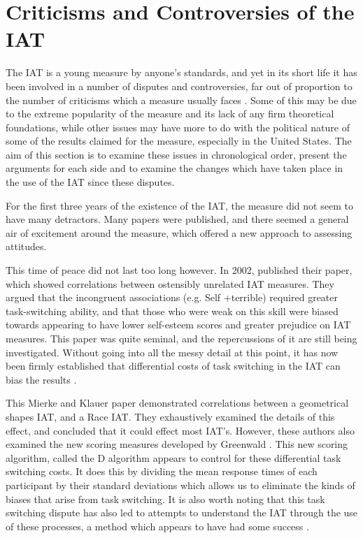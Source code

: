 \section{Criticisms and Controversies of the IAT}

The IAT is a young measure by anyone's standards, and yet in its short life it has been involved in a number of disputes and controversies, far out of proportion to the number of criticisms which a measure usually faces \cite{VonHippel2004}. Some of this may be due to the  extreme popularity of the measure and its lack of any firm theoretical foundations, while other issues may have more to do with the political nature of some of the results claimed for the measure, especially in the United States.  The aim of this section is to examine these issues in chronological order, present the arguments for each side and to examine the changes which have taken place in the use of the IAT since these disputes. 

For the first three years of the existence of the IAT, the measure did not seem to have many detractors. Many papers were published, and there seemed a general air of excitement around the measure, which offered a new approach to assessing attitudes. 

This time of peace did not last too long however. In 2002, \cite{McFarland2002} published their paper, which showed correlations between ostensibly unrelated IAT measures. They argued that the incongruent associations (e.g. Self +terrible) required greater task-switching ability, and that those who were weak on this skill were biased towards appearing to have lower self-esteem scores and greater prejudice on IAT measures. This paper was quite seminal, and the repercussions of it are still being investigated. Without going into all the messy detail at this point, it has now been firmly established that differential costs of task switching in the IAT can bias the results \cite{Mierke2001,Mierke2003}. 

This Mierke and Klauer paper demonstrated correlations between a geometrical shapes IAT, and a Race IAT. They exhaustively examined the details of this effect, and concluded that it could effect most IAT's. However, these authors also examined the new scoring measures developed by Greenwald \cite{Greenwald2003a}. This new scoring algorithm, called the D algorithm appears to control for these differential task switching costs. It does this by dividing the mean response times of each participant by their standard deviations which allows us to eliminate the kinds of biases that arise from task switching. It is also worth noting that this task switching dispute has also led to attempts to understand the IAT through the use of these processes, a method which appears to have had some success \cite{Klauer2005}. 

